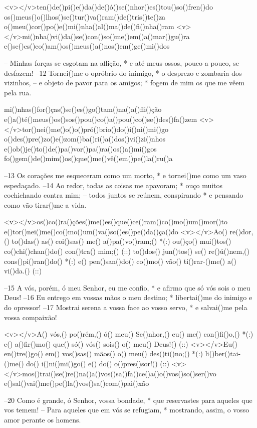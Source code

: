 <v></v>ten()de()pi()e()da()de()ó()se()nhor()es()tou()so()fren()do
os()meus()o()lhos()se()tur()va()ram()de()tris()te()za
o()meu()cor()po()e()mi()nha()al()ma()de()fi()nha()ram
<v></v>mi()nha()vi()da()se()con()so()me()em()a()mar()gu()ra
e()se()es()co()am()os()meus()a()nos()em()ge()mi()dos

– Minhas forças se esgotam na aflição, *
e até meus ossos, pouco a pouco, se desfazem!
–12 Tornei()me o opróbrio do inimigo, *
o desprezo e zombaria dos vizinhos,
– e objeto de pavor para os amigos; *
fogem de mim os que me vêem pela rua.

mi()nhas()for()ças()se()es()go()tam()na()a()fli()ção
e()a()té()meus()os()sos()pou()co()a()pou()co()se()des()fa()zem
<v></v>tor()nei()me()o()o()pró()brio()do()i()ni()mi()go
o()des()pre()zo()e()zom()ba()ri()a()dos()vi()zi()nhos
e()ob()je()to()de()pa()vor()pa()ra()os()a()mi()gos
fo()gem()de()mim()os()que()me()vê()em()pe()la()ru()a

–13 Os corações me esqueceram como um morto, *
e tornei()me como um vaso espedaçado.
–14 Ao redor, todas as coisas me apavoram; *
ouço muitos cochichando contra mim;
– todos juntos se reúnem, conspirando *
e pensando como vão tirar()me a vida.

<v></v>os()co()ra()ções()me()es()que()ce()ram()co()mo()um()mor()to
e()tor()nei()me()co()mo()um()va()so()es()pe()da()ça()do
<v></v>Ao() re()dor,() to()das() as() coi()sas() me() a()pa()vo()ram;() *(:)
ou()ço() mui()tos() co()chi()chan()do() con()tra() mim;() (::)
to()dos() jun()tos() se() re()ú()nem,() cons()pi()ran()do() *(:)
e() pen()san()do() co()mo() vão() ti()rar-()me() a() vi()da.() (::)

–15 A vós, porém, ó meu Senhor, eu me confio, *
e afirmo que só vós sois o meu Deus!
–16 Eu entrego em vossas mãos o meu destino; *
libertai()me do inimigo e do opressor!
–17 Mostrai serena a vossa face ao vosso servo, *
e salvai()me pela vossa compaixão!

<v></v>A() vós,() po()rém,() ó() meu() Se()nhor,() eu() me() con()fi()o,() *(:)
e() a()fir()mo() que() só() vós() sois() o() meu() Deus!() (::)
<v></v>Eu() en()tre()go() em() vos()sas() mãos() o() meu() des()ti()no;() *(:)
li()ber()tai-()me() do() i()ni()mi()go() e() do() o()pres()sor!() (::)
<v></v>mos()trai()se()re()na()a()vos()sa()fa()ce()a()o()vos()so()ser()vo
e()sal()vai()me()pe()la()vos()sa()com()pai()xão

–20 Como é grande, ó Senhor, vossa bondade, *
que reservastes para aqueles que vos temem!
– Para aqueles que em vós se refugiam, *
mostrando, assim, o vosso amor perante os homens.

